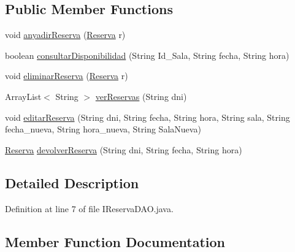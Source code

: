 \subsection*{Public Member Functions}
\begin{DoxyCompactItemize}
\item 
void \mbox{\hyperlink{interfacees_1_1deusto_1_1spq_1_1biblioteca_1_1dao_1_1_i_reserva_d_a_o_a6e0188fb8b5510723e4bc27e838c9fa1}{anyadir\+Reserva}} (\mbox{\hyperlink{classes_1_1deusto_1_1spq_1_1biblioteca_1_1data_1_1_reserva}{Reserva}} r)
\item 
boolean \mbox{\hyperlink{interfacees_1_1deusto_1_1spq_1_1biblioteca_1_1dao_1_1_i_reserva_d_a_o_a81c0cf35733fcd11e44e121d72098236}{consultar\+Disponibilidad}} (String Id\+\_\+\+Sala, String fecha, String hora)
\item 
void \mbox{\hyperlink{interfacees_1_1deusto_1_1spq_1_1biblioteca_1_1dao_1_1_i_reserva_d_a_o_a696cce84b9719e9e858eec9064daa72f}{eliminar\+Reserva}} (\mbox{\hyperlink{classes_1_1deusto_1_1spq_1_1biblioteca_1_1data_1_1_reserva}{Reserva}} r)
\item 
Array\+List$<$ String $>$ \mbox{\hyperlink{interfacees_1_1deusto_1_1spq_1_1biblioteca_1_1dao_1_1_i_reserva_d_a_o_aab8b6916e33fd28d632bab5fe2f1801c}{ver\+Reservas}} (String dni)
\item 
void \mbox{\hyperlink{interfacees_1_1deusto_1_1spq_1_1biblioteca_1_1dao_1_1_i_reserva_d_a_o_a0e93c50de1d6d5d81972418b1f5f86bb}{editar\+Reserva}} (String dni, String fecha, String hora, String sala, String fecha\+\_\+nueva, String hora\+\_\+nueva, String Sala\+Nueva)
\item 
\mbox{\hyperlink{classes_1_1deusto_1_1spq_1_1biblioteca_1_1data_1_1_reserva}{Reserva}} \mbox{\hyperlink{interfacees_1_1deusto_1_1spq_1_1biblioteca_1_1dao_1_1_i_reserva_d_a_o_a5cd7d25bee6f31574e42d290a42cf856}{devolver\+Reserva}} (String dni, String fecha, String hora)
\end{DoxyCompactItemize}


\subsection{Detailed Description}


Definition at line 7 of file I\+Reserva\+D\+A\+O.\+java.



\subsection{Member Function Documentation}
\mbox{\label{interfacees_1_1deusto_1_1spq_1_1biblioteca_1_1dao_1_1_i_reserva_d_a_o_a6e0188fb8b5510723e4bc27e838c9fa1}} 
